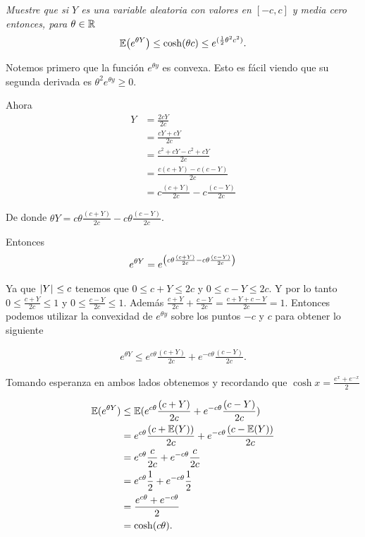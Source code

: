 \emph{
     Muestre que si $Y$ es una variable aleatoria con valores en $[-c,c]$ y media cero entonces, para $\theta\in\mathbb{R}$
    \begin{align}
        \mathbb{E}\! \left( e^{\theta Y} \right) \leq \cosh(\theta c)\leq e^{(\frac{1}{2}\theta^2c^2)}. 
    \end{align}
}

\afterstatement\pn

Notemos primero que la función $e^{\theta y}$ es convexa. Esto es fácil viendo que su segunda derivada es
$\theta^2 e^{\theta y} \geq 0$.\pn

Ahora
\begin{align}
    Y   &=  \frac{2cY}{2c}                              \\
        &=  \frac{cY + cY}{2c}                          \\
        &=  \frac{c^2 + cY - c^2+ cY}{2c}               \\
        &=  \frac{c(c + Y) - c (c - Y)}{2c}             \\  
        &=  c\frac{(c + Y)}{2c} - c \frac{(c - Y)}{2c}  
\end{align}\pn

De donde $\theta Y = c\theta \frac{(c + Y)}{2c} - c\theta \frac{(c - Y)}{2c}$.\pn

Entonces
\begin{align}
    e^{\theta Y} = e^{\left( c\theta \frac{(c + Y)}{2c} - c\theta \frac{(c - Y)}{2c}\right) }
\end{align}\pn

Ya que $\hspace{.25mm}\left|Y\right|\hspace{.25mm} \leq c$ tenemos que $0 \leq c + Y \leq 2c$ y $0 \leq c - Y \leq 2c$. Y por lo tanto 
$0 \leq \frac{c + Y}{2c} \leq 1$ y $0 \leq \frac{c - Y}{2c} \leq 1$. 
Además $\frac{c + Y}{2c} + \frac{c - Y}{2c} = \frac{c + Y + c - Y }{2c} = 1$. Entonces podemos utilizar 
la convexidad de $e^{\theta y}$ sobre los puntos $-c$ y $c$ para obtener lo siguiente

\begin{align}
    e^{\theta Y} \leq e^{c\theta} \frac{(c + Y)}{2c} + e^{-c\theta} \frac{(c - Y)}{2c}.
\end{align}\pn

Tomando esperanza en ambos lados obtenemos y recordando que $\cosh{x} = \frac{e^x + e^{-x}}{2}$

\begin{align}
    \mathbb{E}(e^{\theta Y})    &\leq   \mathbb{E}(e^{c\theta} \frac{(c + Y)}{2c} + e^{-c\theta} \frac{(c - Y)}{2c})            \\
                        &=      e^{c\theta} \frac{(c + \mathbb{E}(Y))}{2c} + e^{-c\theta} \frac{(c - \mathbb{E}(Y))}{2c}        \\
                        &=      e^{c\theta} \frac{c}{2c} + e^{-c\theta} \frac{c}{2c}                            \\
                        &=      e^{c\theta} \frac{1}{2} + e^{-c\theta} \frac{1}{2}                              \\                       
                        &=      \frac{e^{c\theta} + e^{-c\theta}}{2}                                            \\
                        &=      \cosh(c \theta).
\end{align}\pn

